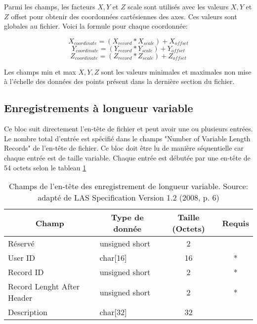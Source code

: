 Parmi les champs, les facteurs $ X, Y $ et $ Z $ scale sont utilisés avec les valeurs $ X, Y$ et $Z$ offset pour obtenir des coordonnées cartésiennes des axes.
Ces valeurs sont globales au fichier. Voici la formule pour chaque coordonnée:

\begin{equation*}
    X_{coordinate} = (X_{record} * X_{scale}) + X_{offset}
\end{equation*}
\begin{equation*}
    Y_{coordinate}= (Y_{record} * Y_{scale}) + Y_{offset}
\end{equation*}
\begin{equation*}
    Z_{coordinate}= (Z_{record} * Z_{scale}) + Z_{offset}
\end{equation*}

Les champs min et max $X, Y, Z$ sont les valeurs minimales et maximales non mise à l'échelle des données des points présent dans la dernière section du fichier.

\subsection{Enregistrements à longueur variable}

Ce bloc suit directement l'en-tête de fichier et peut avoir une ou plusieurs entrées.
Le nombre total d'entrée est spécifié dans le champs "Number of Variable Length Records" de l'en-tête de fichier.
Ce bloc doit être lu de manière séquentielle car chaque entrée est de taille variable.
Chaque entrée est débutée par une en-tête de 54 octets selon le tableau \ref{tab:las_var_record_header}

\begin{table}[!htb]
\centering
\begin{tabular}{|l|l|c|c|}
\hline
\multicolumn{1}{|c|}{\textbf{Champ}} & \multicolumn{1}{c|}{\textbf{Type de donnée}} & \textbf{Taille (Octets)} & \textbf{Requis} \\ \hline
Réservé                              & unsigned short                               & 2                        &                 \\ \hline
User ID                              & char{[}16{]}                                 & 16                       & *               \\ \hline
Record ID                            & unsigned short                               & 2                        & *               \\ \hline
Record Lenght After Header           & unsigned short                               & 2                        & *               \\ \hline
Description                          & char{[}32{]}                                 & 32                       &                 \\ \hline
\end{tabular}
\caption{
Champs de l'en-tête des enregistrement de longueur variable.
Source: adapté de LAS Specification Version 1.2 (2008, p. 6)}
\label{tab:las_var_record_header}
\end{table}

